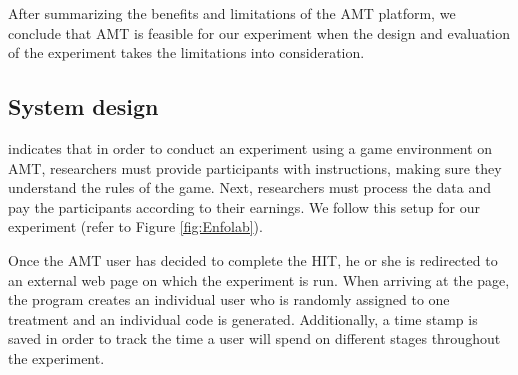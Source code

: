 After summarizing the benefits and limitations of the \ac{AMT} platform, we conclude that \ac{AMT} is feasible for our experiment when the design and evaluation of the experiment takes the limitations into consideration.

\subsection{System design}

\cite{Rand2012} indicates that in order to conduct an experiment using a game environment on \ac{AMT}, researchers must provide participants with instructions, making sure they understand the rules of the game. Next, researchers must process the data and pay the participants according to their earnings. We follow this setup for our experiment (refer to Figure \ref{fig:Enfolab}).

Once the \ac{AMT} user has decided to complete the \ac{HIT}, he or she is redirected to an external web page on which the experiment is run.
When arriving at the page, the program creates an individual user who is randomly assigned to one treatment and an individual code is generated. 
Additionally, a time stamp is saved in order to track the time a user will spend on different stages throughout the experiment.

